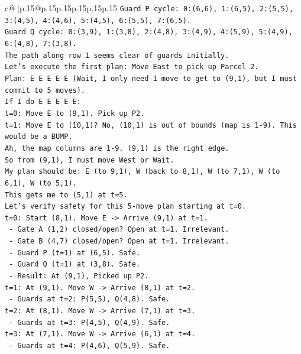 \documentclass{article}
\begin{document}
{\begin{supertabular}{c@{$\;$}|p{.15\linewidth}@{}p{.15\linewidth}p{.15\linewidth}p{.15\linewidth}p{.15\linewidth}p{.15\linewidth}}
{{{\texttt{Guard P cycle: 0:(6,6), 1:(6,5), 2:(5,5), 3:(4,5), 4:(4,6), 5:(4,5), 6:(5,5), 7:(6,5).} \\
\texttt{Guard Q cycle: 0:(3,9), 1:(3,8), 2:(4,8), 3:(4,9), 4:(5,9), 5:(4,9), 6:(4,8), 7:(3,8).} \\
\texttt{The path along row 1 seems clear of guards initially.} \\
\texttt{Let's execute the first plan: Move East to pick up Parcel 2.} \\
\texttt{Plan: E E E E E (Wait, I only need 1 move to get to (9,1), but I must commit to 5 moves).} \\
\texttt{If I do E E E E E:} \\
\texttt{t=0: Move E to (9,1). Pick up P2.} \\
\texttt{t=1: Move E to (10,1)? No, (10,1) is out of bounds (map is 1{-}9). This would be a BUMP.} \\
\texttt{Ah, the map columns are 1{-}9. (9,1) is the right edge.} \\
\texttt{So from (9,1), I must move West or Wait.} \\
\texttt{My plan should be: E (to 9,1), W (back to 8,1), W (to 7,1), W (to 6,1), W (to 5,1).} \\
\texttt{This gets me to (5,1) at t=5.} \\
\texttt{Let's verify safety for this 5{-}move plan starting at t=0.} \\
\texttt{t=0: Start (8,1). Move E {-}> Arrive (9,1) at t=1.} \\
\texttt{  {-} Gate A (1,2) closed/open? Open at t=1. Irrelevant.} \\
\texttt{  {-} Gate B (4,7) closed/open? Open at t=1. Irrelevant.} \\
\texttt{  {-} Guard P (t=1) at (6,5). Safe.} \\
\texttt{  {-} Guard Q (t=1) at (3,8). Safe.} \\
\texttt{  {-} Result: At (9,1), Picked up P2.} \\
\texttt{t=1: At (9,1). Move W {-}> Arrive (8,1) at t=2.} \\
\texttt{  {-} Guards at t=2: P(5,5), Q(4,8). Safe.} \\
\texttt{t=2: At (8,1). Move W {-}> Arrive (7,1) at t=3.} \\
\texttt{  {-} Guards at t=3: P(4,5), Q(4,9). Safe.} \\
\texttt{t=3: At (7,1). Move W {-}> Arrive (6,1) at t=4.} \\
\texttt{  {-} Guards at t=4: P(4,6), Q(5,9). Safe.} \\
}}}
\end{supertabular}}
\end{document}
